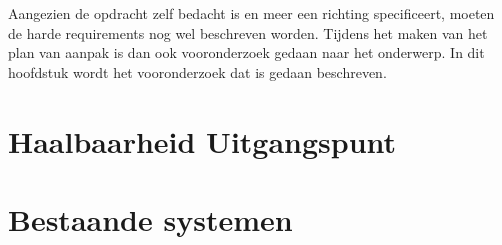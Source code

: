 
Aangezien de opdracht zelf bedacht is en meer een richting specificeert, moeten de harde requirements nog wel beschreven worden. Tijdens het maken van het plan van aanpak is dan ook vooronderzoek gedaan naar het onderwerp. In dit hoofdstuk wordt het vooronderzoek dat is gedaan beschreven.

\section{Haalbaarheid Uitgangspunt}



\section{Bestaande systemen}


